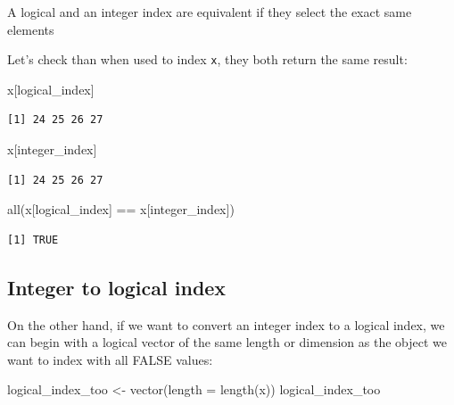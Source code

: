 \documentclass[
]{book}
\newenvironment{Shaded}{\begin{snugshade}}{\end{snugshade}}
\newcommand{\AttributeTok}[1]{\textcolor[rgb]{0.77,0.63,0.00}{#1}}
\newcommand{\FunctionTok}[1]{\textcolor[rgb]{0.00,0.00,0.00}{#1}}
\newcommand{\NormalTok}[1]{#1}
\newcommand{\OtherTok}[1]{\textcolor[rgb]{0.56,0.35,0.01}{#1}}
\newcommand{\SpecialCharTok}[1]{\textcolor[rgb]{0.00,0.00,0.00}{#1}}
\begin{document}
\begin{rmdnote}
A logical and an integer index are equivalent if they select the exact
same elements
\end{rmdnote}

Let's check than when used to index \texttt{x}, they both return the same result:

\begin{Shaded}
\begin{Highlighting}[]
\NormalTok{x[logical\_index]}
\end{Highlighting}
\end{Shaded}

\begin{verbatim}
[1] 24 25 26 27
\end{verbatim}

\begin{Shaded}
\begin{Highlighting}[]
\NormalTok{x[integer\_index]}
\end{Highlighting}
\end{Shaded}

\begin{verbatim}
[1] 24 25 26 27
\end{verbatim}

\begin{Shaded}
\begin{Highlighting}[]
\FunctionTok{all}\NormalTok{(x[logical\_index] }\SpecialCharTok{==}\NormalTok{ x[integer\_index])}
\end{Highlighting}
\end{Shaded}

\begin{verbatim}
[1] TRUE
\end{verbatim}

\hypertarget{integer-to-logical-index}{%
\subsection{Integer to logical index}\label{integer-to-logical-index}}

On the other hand, if we want to convert an integer index to a logical index, we can begin with a logical vector of the same length or dimension as the object we want to index with all FALSE values:

\begin{Shaded}
\begin{Highlighting}[]
\NormalTok{logical\_index\_too }\OtherTok{\textless{}{-}} \FunctionTok{vector}\NormalTok{(}\AttributeTok{length =} \FunctionTok{length}\NormalTok{(x))}
\NormalTok{logical\_index\_too}
\end{Highlighting}
\end{Shaded}
\end{document}
